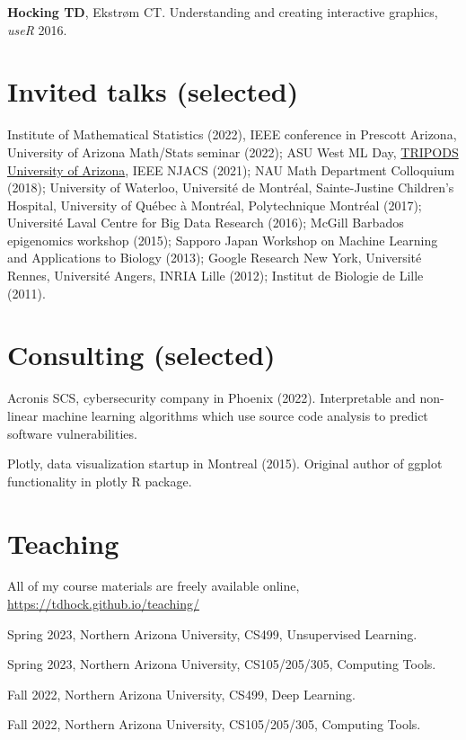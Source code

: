 \documentclass[margin,line]{res}
\begin{document}
\begin{resume}
{\bf Hocking TD}, Ekstr\o m CT. Understanding and creating interactive
graphics, {\it useR} 2016.

\section{\sc Invited talks (selected)}

Institute of Mathematical Statistics (2022), IEEE conference in
Prescott Arizona, University of Arizona Math/Stats seminar (2022); ASU
West ML Day,
\href{https://arizona.hosted.panopto.com/Panopto/Pages/Viewer.aspx?id=4e87c8d0-96d2-40d1-808c-ad16014c6962}{TRIPODS
  University of Arizona}, IEEE NJACS (2021); NAU Math Department
Colloquium (2018); University of Waterloo, Université de Montréal,
Sainte-Justine Children's Hospital, University of Québec à Montréal,
Polytechnique Montréal (2017); Universit\'e Laval Centre for Big Data
Research (2016); McGill Barbados epigenomics workshop (2015); Sapporo
Japan Workshop on Machine Learning and Applications to Biology (2013);
Google Research New York, Universit\'e Rennes, Universit\'e Angers,
INRIA Lille (2012); Institut de Biologie de Lille (2011).

\section{\sc Consulting (selected)}

Acronis SCS, cybersecurity company in Phoenix (2022). Interpretable
and non-linear machine learning algorithms which use source code
analysis to predict software vulnerabilities.

Plotly, data visualization startup in Montreal (2015). Original author
of ggplot functionality in plotly R package.

\section{\sc Teaching}

All of my course materials are freely available online,
\url{https://tdhock.github.io/teaching/}

Spring 2023, Northern Arizona University, CS499, Unsupervised Learning.

Spring 2023, Northern Arizona University, CS105/205/305, Computing Tools.

Fall 2022, Northern Arizona University, CS499, Deep Learning.

Fall 2022, Northern Arizona University, CS105/205/305, Computing Tools.


\end{resume}
\end{document}
